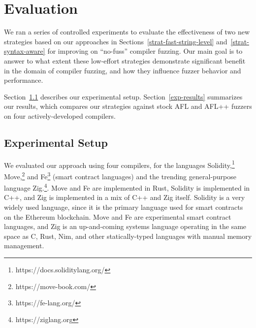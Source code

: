 \section{Evaluation}
\label{eval}

We ran a series of controlled experiments to evaluate the effectiveness of two
new strategies based on our approaches in Sections~\ref{strat-fast-string-level}
and~\ref{strat-syntax-aware} for improving on ``no-fuss'' compiler fuzzing. Our
main goal is to answer to what extent these low-effort strategies demonstrate
significant benefit in the domain of compiler fuzzing, and how they influence
fuzzer behavior and performance.

Section~\ref{exp-setup} describes our experimental setup.
Section~\ref{exp-results} summarizes our results, which compares our strategies
against stock AFL and AFL++ fuzzers on four actively-developed compilers. 

\subsection{Experimental Setup}
\label{exp-setup}

We evaluated our approach using four compilers,  for the languages Solidity,\footnote{https://docs.soliditylang.org/}
Move,\footnote{https://move-book.com/} and Fe\footnote{https://fe-lang.org/} (smart contract languages)
and the trending general-purpose language
Zig.\footnote{https://ziglang.org}.  Move and Fe are implemented in
Rust, Solidity is implemented in C++, and Zig is implemented in a mix
of C++ and Zig itself.  Solidity is a very widely used language, since
it is the primary language used for smart contracts on the Ethereum
blockchain.  Move and Fe are experimental smart contract languages,
and Zig is an up-and-coming systems language operating in
the same space as C, Rust, Nim, and other statically-typed languages
with manual memory management.

